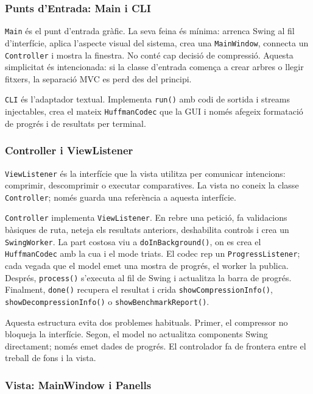 \documentclass[conference,compsoc]{IEEEtran}
\begin{document}
\subsubsection{Punts d'Entrada: Main i CLI}

\texttt{Main} és el punt d'entrada gràfic. La seva feina és mínima:
arrenca Swing al fil d'interfície, aplica l'aspecte visual del sistema,
crea una \texttt{MainWindow}, connecta un \texttt{Controller} i mostra la
finestra. No conté cap decisió de compressió. Aquesta simplicitat és
intencionada: si la classe d'entrada comença a crear arbres o llegir
fitxers, la separació MVC es perd des del principi.

\texttt{CLI} és l'adaptador textual. Implementa \texttt{run()} amb codi de
sortida i streams injectables, crea el mateix \texttt{HuffmanCodec} que la
GUI i només afegeix formatació de progrés i de resultats per terminal.

\subsubsection{Controller i ViewListener}

\texttt{ViewListener} és la interfície que la vista utilitza per comunicar
intencions: comprimir, descomprimir o executar comparatives. La vista no
coneix la classe \texttt{Controller}; només guarda una referència a aquesta
interfície.

\texttt{Controller} implementa \texttt{ViewListener}. En rebre una petició,
fa validacions bàsiques de ruta, neteja els resultats anteriors,
deshabilita controls i crea un \texttt{SwingWorker}. La part costosa viu a
\texttt{doInBackground()}, on es crea el \texttt{HuffmanCodec} amb la cua i
el mode triats. El codec rep un \texttt{ProgressListener}; cada vegada que
el model emet una mostra de progrés, el worker la publica. Després,
\texttt{process()} s'executa al fil de Swing i actualitza la barra de
progrés. Finalment, \texttt{done()} recupera el resultat i crida
\texttt{showCompressionInfo()}, \texttt{showDecompressionInfo()} o
\texttt{showBenchmarkReport()}.

Aquesta estructura evita dos problemes habituals. Primer, el compressor no
bloqueja la interfície. Segon, el model no actualitza components Swing
directament; només emet dades de progrés. El controlador fa de frontera
entre el treball de fons i la vista.

\subsubsection{Vista: MainWindow i Panells}
\end{document}
